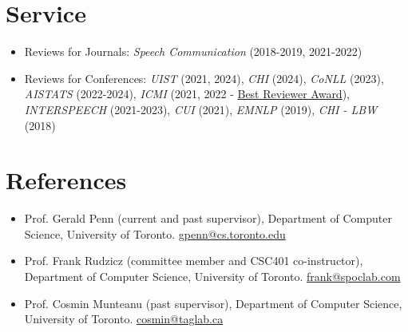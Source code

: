 \documentclass{article}
\begin{document}
\section{Service}

\begin{itemize}
  \item Reviews for Journals:%
    \textit{Speech Communication} (2018-2019, 2021-2022)
  \item Reviews for Conferences:%
    \textit{UIST} (2021, 2024),%
    \textit{CHI} (2024),%
    \textit{CoNLL} (2023),%
    \textit{AISTATS} (2022-2024),%
    \textit{ICMI} (2021, 2022 - \href{https://icmi.acm.org/2022/awards/}{Best Reviewer Award}),%
    \textit{INTERSPEECH} (2021-2023),%
    \textit{CUI} (2021),%
    \textit{EMNLP} (2019),%
    \textit{CHI - LBW} (2018)%
\end{itemize}

\section{References}

\begin{itemize}
  \item Prof. Gerald Penn (current and past supervisor), Department of
    Computer Science, University of Toronto.
    \href{mailto:gpenn@cs.toronto.edu}{gpenn@cs.toronto.edu}
  \item Prof. Frank Rudzicz (committee member and CSC401 co-instructor),
    Department of Computer Science, University of Toronto.
    \href{mailto:frank@spoclab.com}{frank@spoclab.com}
  \item Prof. Cosmin Munteanu (past supervisor), Department of Computer Science,
    University of Toronto. \href{mailto:cosmin@taglab.ca}{cosmin@taglab.ca}
\end{itemize}
\end{document}
